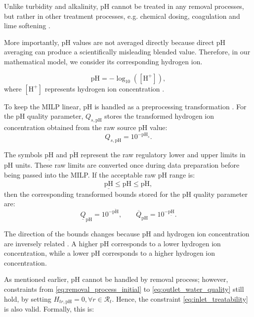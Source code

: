 Unlike turbidity and alkalinity, pH cannot be treated in any removal processes, but rather in other treatment processes, e.g. chemical dosing,  coagulation and lime softening \cite{who2004water}.

More importantly, $\mathrm{pH}$ values are not averaged directly because direct $\mathrm{pH}$ averaging can produce a scientifically misleading blended value.
Therefore, in our mathematical model, we consider its corresponding hydrogen ion.

\begin{equation}\label{eq:ph_definition}
    \mathrm{pH} = -\log_{10}([\mathrm{H}^{+}]),
\end{equation}
where $[\mathrm{H}^{+}]$ represents hydrogen ion concentration \cite{EPA2026pH}.

To keep the MILP linear, $\mathrm{pH}$ is handled as a preprocessing transformation \cite{WHO2007pH}.
For the $\mathrm{pH}$ quality parameter, $Q_{s,\mathrm{pH}}$ stores the transformed hydrogen ion concentration obtained from the raw source $\mathrm{pH}$ value:
\begin{equation}\label{eq:ph_source_transformation}
    Q_{s,\mathrm{pH}} = 10^{-\mathrm{pH}_s}.
\end{equation}

The symbols $\underline{\mathrm{pH}}$ and $\overline{\mathrm{pH}}$ represent the raw regulatory lower and upper limits in $\mathrm{pH}$ units.
These raw limits are converted once during data preparation before being passed into the MILP.
If the acceptable raw $\mathrm{pH}$ range is:
\begin{equation}\label{eq:raw_ph_range}
    \underline{\mathrm{pH}} \leq
    \mathrm{pH}
    \leq
    \overline{\mathrm{pH}},
\end{equation}
then the corresponding transformed bounds stored for the $\mathrm{pH}$ quality parameter are:
\begin{equation}\label{eq:ph_bound_transformation}
    \underline{Q}_{\mathrm{pH}} = 10^{-\overline{\mathrm{pH}}},
    \qquad
    \overline{Q}_{\mathrm{pH}} = 10^{-\underline{\mathrm{pH}}}.
\end{equation}

The direction of the bounds changes because $\mathrm{pH}$ and hydrogen ion concentration are inversely related \cite{Fondriest2025pH}.
A higher $\mathrm{pH}$ corresponds to a lower hydrogen ion concentration, while a lower $\mathrm{pH}$ corresponds to a higher hydrogen ion concentration.

As mentioned earlier, pH cannot be handled by removal process; however, constraints from \eqref{eq:removal_process_initial} to \eqref{eq:outlet_water_quality} still hold, by setting $H_{tr,\mathrm{pH}} = 0, \forall r \in \mathcal R_t$.
Hence, the constraint \eqref{eq:inlet_treatability} is also valid. Formally, this is:

